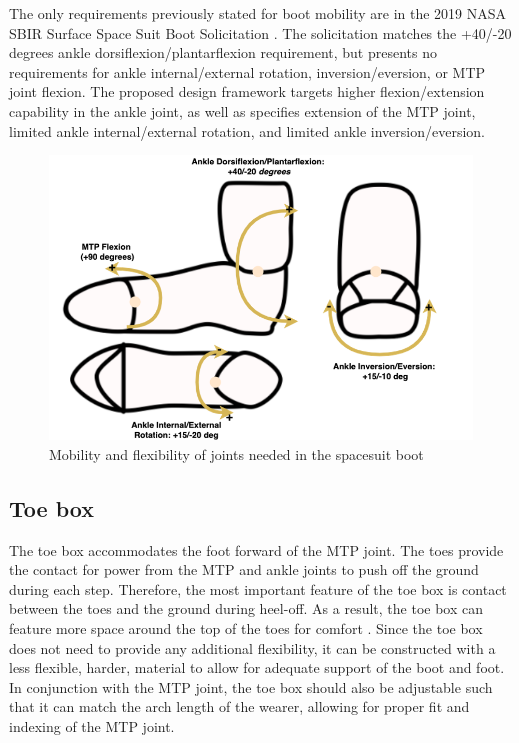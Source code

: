 \documentclass[defaultstyle,11pt]{comps}
\begin{document}
The only requirements previously stated for boot mobility are in the 2019 NASA SBIR Surface Space Suit Boot Solicitation \citep{NASA2019}.
The solicitation matches the +40/-20 degrees ankle dorsiflexion/plantarflexion requirement, but presents no requirements for ankle internal/external rotation, inversion/eversion, or MTP joint flexion.
The proposed design framework targets higher flexion/extension capability in the ankle joint, as well as specifies extension of the MTP joint, limited ankle internal/external rotation, and limited ankle inversion/eversion.

\begin{figure}
\hypertarget{fig:SA3-Mobility}{%
\centering
\includegraphics{../fig/SA3/Mobility.png}
\caption{Mobility and flexibility of joints needed in the spacesuit boot}\label{fig:SA3-Mobility}
}
\end{figure}

\hypertarget{toe-box}{%
\subsection{Toe box}\label{toe-box}}

The toe box accommodates the foot forward of the MTP joint.
The toes provide the contact for power from the MTP and ankle joints to push off the ground during each step.
Therefore, the most important feature of the toe box is contact between the toes and the ground during heel-off.
As a result, the toe box can feature more space around the top of the toes for comfort \citep{Luximon2009}.
Since the toe box does not need to provide any additional flexibility, it can be constructed with a less flexible, harder, material to allow for adequate support of the boot and foot.
In conjunction with the MTP joint, the toe box should also be adjustable such that it can match the arch length of the wearer, allowing for proper fit and indexing of the MTP joint.
\end{document}

